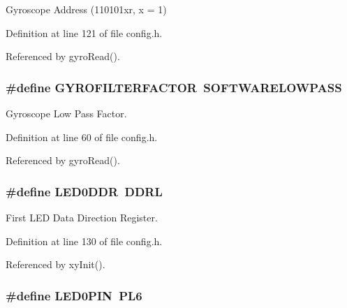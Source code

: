 Gyroscope Address (110101xr, x = 1) 



Definition at line 121 of file config.\-h.



Referenced by gyro\-Read().

\hypertarget{group__config_ga1b5d47810976ecbfd688513246db3ba9}{
\subsubsection[{G\-Y\-R\-O\-F\-I\-L\-T\-E\-R\-F\-A\-C\-T\-O\-R}]{\setlength{\rightskip}{0pt plus 5cm}\#define G\-Y\-R\-O\-F\-I\-L\-T\-E\-R\-F\-A\-C\-T\-O\-R~{\bf S\-O\-F\-T\-W\-A\-R\-E\-L\-O\-W\-P\-A\-S\-S}}}\label{group__config_ga1b5d47810976ecbfd688513246db3ba9}


Gyroscope Low Pass Factor. 



Definition at line 60 of file config.\-h.



Referenced by gyro\-Read().

\hypertarget{group__config_ga86208659221ec2a932cd722dfc18101f}{
\subsubsection[{L\-E\-D0\-D\-D\-R}]{\setlength{\rightskip}{0pt plus 5cm}\#define L\-E\-D0\-D\-D\-R~D\-D\-R\-L}}\label{group__config_ga86208659221ec2a932cd722dfc18101f}


First L\-E\-D Data Direction Register. 



Definition at line 130 of file config.\-h.



Referenced by xy\-Init().

\hypertarget{group__config_gab0e1f692e2b1fa1cdbb24a9926b3489d}{
\subsubsection[{L\-E\-D0\-P\-I\-N}]{\setlength{\rightskip}{0pt plus 5cm}\#define L\-E\-D0\-P\-I\-N~P\-L6}}\label{group__config_gab0e1f692e2b1fa1cdbb24a9926b3489d}



